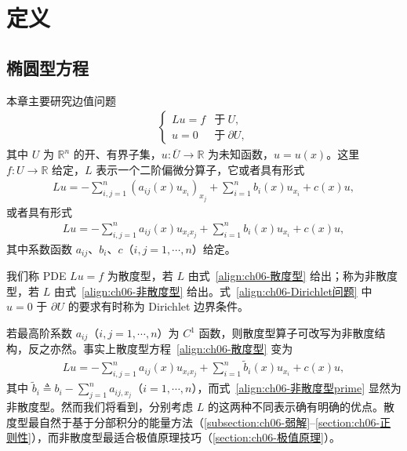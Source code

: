 \documentclass[../../main.tex]{subfiles}
\begin{document}
\section{定义}\label{section:ch06-定义}

\subsection{椭圆型方程}\label{subsection:ch06-椭圆方程}

本章主要研究边值问题
\begin{align}
\begin{cases}
Lu=f & \text{于}\ U,\\
u=0 & \text{于}\ \partial U,
\end{cases}
\label{align:ch06-Dirichlet问题}
\end{align}
其中 $U$ 为 $\mathbb{R}^{n}$ 的开、有界子集，$u:\overline{U}\to\mathbb{R}$ 为未知函数，$u=u(x)$。这里 $f:U\to\mathbb{R}$ 给定，$L$ 表示一个二阶偏微分算子，它或者具有形式
\begin{align}
Lu=-\sum_{i,j=1}^{n}(a_{ij}(x)u_{x_{i}})_{x_{j}}+\sum_{i=1}^{n}b_{i}(x)u_{x_{i}}+c(x)u,
\label{align:ch06-散度型}
\end{align}
或者具有形式
\begin{align}
Lu=-\sum_{i,j=1}^{n}a_{ij}(x)u_{x_{i}x_{j}}+\sum_{i=1}^{n}b_{i}(x)u_{x_{i}}+c(x)u,
\label{align:ch06-非散度型}
\end{align}
其中系数函数 $a_{ij}$、$b_{i}$、$c$（$i,j=1,\cdots,n$）给定。

我们称 PDE $Lu=f$ 为散度型，若 $L$ 由式~\eqref{align:ch06-散度型} 给出；称为非散度型，若 $L$ 由式~\eqref{align:ch06-非散度型} 给出。式~\eqref{align:ch06-Dirichlet问题} 中 $u=0$ 于 $\partial U$ 的要求有时称为 Dirichlet 边界条件。

\begin{remark}\label{remark:ch06-散度非散度}
若最高阶系数 $a_{ij}$（$i,j=1,\cdots,n$）为 $C^{1}$ 函数，则散度型算子可改写为非散度结构，反之亦然。事实上散度型方程~\eqref{align:ch06-散度型} 变为
\begin{align}
Lu=-\sum_{i,j=1}^{n}a_{ij}(x)u_{x_{i}x_{j}}+\sum_{i=1}^{n}\widetilde{b}_{i}(x)u_{x_{i}}+c(x)u,
\label{align:ch06-非散度型prime}
\end{align}
其中 $\widetilde{b}_{i}\triangleq b_{i}-\sum_{j=1}^{n}a_{ij,x_{j}}$（$i=1,\cdots,n$），而式~\eqref{align:ch06-非散度型prime} 显然为非散度型。然而我们将看到，分别考虑 $L$ 的这两种不同表示确有明确的优点。散度型最自然于基于分部积分的能量方法（\cref{subsection:ch06-弱解}--\cref{section:ch06-正则性}），而非散度型最适合极值原理技巧（\cref{section:ch06-极值原理}）。
\end{remark}
\end{document}
